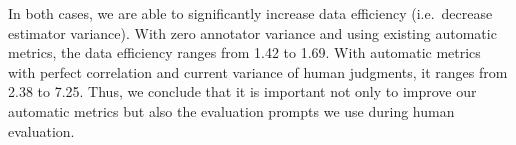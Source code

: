 In both cases, we are able to significantly increase data efficiency (i.e.\ decrease estimator variance).
With zero annotator variance and using existing automatic metrics,
the data efficiency ranges from 1.42 to 1.69. With automatic metrics with perfect correlation and current variance of human judgments,
it ranges from 2.38 to 7.25.
Thus, we conclude that it is important not only to improve our automatic metrics but also the evaluation prompts we use during human evaluation. 
